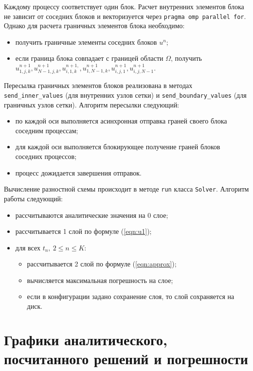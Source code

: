 \documentclass[oneside, final, 12pt]{extarticle}
\newcommand{\classname}[1]{\texttt{#1}}
\begin{document}
Каждому процессу соответствует один блок. Расчет внутренних элементов блока не зависит от соседних блоков и
векторизуется через \classname{pragma omp parallel for}.
Однако для расчета граничных элементов блока необходимо:
\begin{itemize}
\item получить граничные элементы соседних блоков $ u^n $;
\item если граница блока совпадает с границей области $ \Omega $, получить
$ u^{n + 1}_{1,j,k}, u^{n + 1}_{N - 1,j,k}, u^{n + 1, }_{i,1,k}, u^{n + 1}_{1,N - 1,k}, u^{n + 1}_{i,j,1}, u^{n + 1}_{i,j,N - 1} $.
\end{itemize}

Пересылка граничных элементов блоков реализована в методах \classname{send\_inner\_values} (для внутренних узлов сетки) и \classname{send\_boundary\_values}
(для граничных узлов сетки). Алгоритм пересылки следующий:
\begin{itemize}
    \item по каждой оси выполняется асинхронная отправка граней своего блока соседним процессам;
    \item для каждой оси выполняется блокирующее получение граней блоков соседних процессов;
    \item процесс дожидается завершения отправок.
\end{itemize}

Вычисление разностной схемы происходит в методе \classname{run} класса \classname{Solver}. Алгоритм работы следующий:
\begin{itemize}
    \item рассчитываются аналитические значения на 0 слое;
    \item рассчитывается 1 слой по формуле (\ref{eqn:u1});
    \item для всех $ t_n, \: 2 \leq n \leq K $:
    \begin{itemize}
    \item рассчитывается 2 слой по формуле (\ref{eqn:approx});
    \item вычисляется максимальная погрешность на слое;
    \item если в конфигурации задано сохранение слоя, то слой сохраняется на диск.
    \end{itemize}
\end{itemize}

\section{Графики аналитического, посчитанного решений и погрешности}
\end{document}
